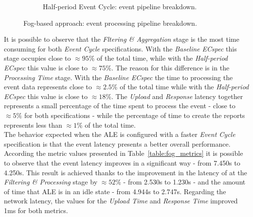 \begin{figure}[ht!]
\begin{subfigure}{.5\textwidth}
    \caption{Half-period Event Cycle: event pipeline breakdown.}
    \label{fig:ecspec_effective_half}
  \end{subfigure}
  \caption[Fog-based approach: event processing breakdown.]{Fog-based approach: event processing pipeline breakdown.}
  \label{fig:ecspec_effective_breakdown}
\end{figure}

It is possible to observe that the \textit{Fltering \& Aggregation} stage is the most time consuming
for both \textit{Event Cycle} specifications. With the \textit{Baseline ECspec} this stage occupies
close to $\approx95\%$ of the total time, while with the \textit{Half-period ECspec} this value is
close to $\approx75\%$. The reason for this difference is in the \textit{Processing Time} stage.
With the \textit{Baseline ECspec} the time to processing the event data represents close to $\approx2.5\%$
of the total time while with the \textit{Half-period ECspec} this value is close to $\approx18\%$.
The \textit{Upload} and \textit{Response} latency together represents a small percentage of
the time spent to process the event - close to $\approx5\%$ for both specifications - while the percentage
of time to create the reports represents less than $\approx1\%$ of the total time.\\

The behavior expected when the \gls{ALE} is configured with a faster \textit{Event Cycle} specification
is that the event latency presents a better overall performance. According the metric values presented in
Table~\ref{table:fog_metrics} it is possible to observe that the event latency improves in a significant
way - from 7.450s to 4.250s. This result is achieved thanks to the improvement in the latency
of at the \textit{Filtering \& Processing} stage by $\approx52\%$ - from 2.530s to 1.230s - and the
amount of time that \gls{ALE} is in an idle state - from 4.944s to 2.747s. Regarding the network
latency, the values for the \textit{Upload Time} and \textit{Response Time} improved 1ms for both
metrics.\\

